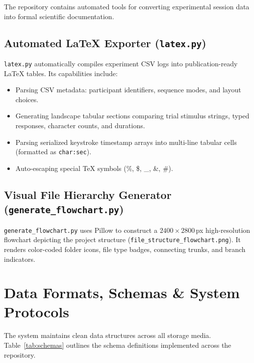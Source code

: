 \documentclass[11pt,a4paper]{article}
\begin{document}
The repository contains automated tools for converting experimental session data into formal scientific documentation.

\subsection{Automated LaTeX Exporter (\texttt{latex.py})}
\texttt{latex.py} automatically compiles experiment CSV logs into publication-ready LaTeX tables. Its capabilities include:
\begin{itemize}
    \item Parsing CSV metadata: participant identifiers, sequence modes, and layout choices.
    \item Generating landscape tabular sections comparing trial stimulus strings, typed responses, character counts, and durations.
    \item Parsing serialized keystroke timestamp arrays into multi-line tabular cells (formatted as \texttt{char:sec}).
    \item Auto-escaping special TeX symbols (\%, \$, \_, \&, \#).
\end{itemize}

\subsection{Visual File Hierarchy Generator (\texttt{generate\_flowchart.py})}
\texttt{generate\_flowchart.py} uses Pillow to construct a $2400 \times 2800$\,px high-resolution flowchart depicting the project structure (\texttt{file\_structure\_flowchart.png}). It renders color-coded folder icons, file type badges, connecting trunks, and branch indicators.

\section{Data Formats, Schemas \& System Protocols}

The system maintains clean data structures across all storage media. Table~\ref{tab:schemas} outlines the schema definitions implemented across the repository.
\end{document}
